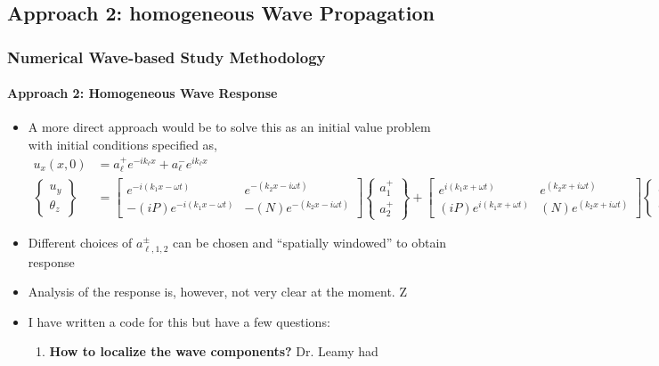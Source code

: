 \documentclass[aspectratio=169]{beamertmd}
\begin{document}
\subsection{Approach 2: homogeneous Wave Propagation}
\label{sec:appr-2:-hom}

\begin{frame}[allowframebreaks]
  \frametitle{Numerical Wave-based Study Methodology}
  \framesubtitle{Approach 2: Homogeneous Wave Response}
  \begin{itemize}
  \item A more direct approach would be to solve this as an initial
    value problem with initial conditions specified as,
    {\footnotesize
      \begin{align*}
        u_x(x, 0) &= a_{\ell}^+ e^{-ik_\ell x} + a_{\ell}^- e^{ik_\ell
                    x}\\
        \begin{Bmatrix} u_y\\ \theta_z \end{Bmatrix} &= \begin{bmatrix}
          e^{-i(k_1x-\omega t)} & 
          e^{-(k_2x-i\omega t)} \\
          -(iP)e^{-i(k_1x-\omega t)} & -(N)
          e^{-(k_2x-i\omega t)} \end{bmatrix} \begin{Bmatrix} a_1^+\\
          a_2^+ \end{Bmatrix} + \begin{bmatrix} e^{i(k_1x+\omega t)} & 
          e^{(k_2x+i\omega t)}\\ (iP) e^{i(k_1x+\omega t)} & (N) e^{(k_2x+i\omega
            t)} \end{bmatrix} \begin{Bmatrix} a_1^-\\
          a_2^- \end{Bmatrix} 
      \end{align*}}
  \item Different choices of $a_{\ell,1,2}^\pm$ can be chosen and
    ``spatially windowed'' to obtain response
  \item Analysis of the response is, however, not very clear at the
    moment.
    \pagebreak
    Z\item I have written a code for this but have a few questions:
    \begin{enumerate}
    \item \textbf{How to localize the wave components?} Dr. Leamy had

\end{enumerate}
\end{itemize}
\end{frame}
\end{document}
